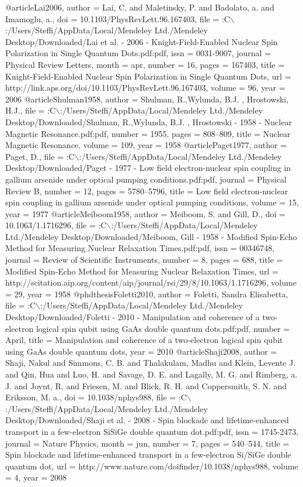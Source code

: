 @article{Lai2006,
author = {Lai, C. and Maletinsky, P. and Badolato, a. and Imamoglu, a.},
doi = {10.1103/PhysRevLett.96.167403},
file = {:C$\backslash$:/Users/Steffi/AppData/Local/Mendeley Ltd./Mendeley Desktop/Downloaded/Lai et al. - 2006 - Knight-Field-Enabled Nuclear Spin Polarization in Single Quantum Dots.pdf:pdf},
issn = {0031-9007},
journal = {Physical Review Letters},
month = {apr},
number = {16},
pages = {167403},
title = {{Knight-Field-Enabled Nuclear Spin Polarization in Single Quantum Dots}},
url = {http://link.aps.org/doi/10.1103/PhysRevLett.96.167403},
volume = {96},
year = {2006}
}
@article{Shulman1958,
author = {{Shulman, R.,Wylunda, B.J. , Hrostowski}, H.J.},
file = {:C$\backslash$:/Users/Steffi/AppData/Local/Mendeley Ltd./Mendeley Desktop/Downloaded/Shulman, R.,Wylunda, B.J. , Hrostowski - 1958 - Nuclear Magnetic Resonance.pdf:pdf},
number = {1955},
pages = {808--809},
title = {{Nuclear Magnetic Resonance}},
volume = {109},
year = {1958}
}
@article{Paget1977,
author = {Paget, D.},
file = {:C$\backslash$:/Users/Steffi/AppData/Local/Mendeley Ltd./Mendeley Desktop/Downloaded/Paget - 1977 - Low field electron-nuclear spin coupling in gallium arsenide under optical pumping conditions.pdf:pdf},
journal = {Physical Review B},
number = {12},
pages = {5780--5796},
title = {{Low field electron-nuclear spin coupling in gallium arsenide under optical pumping conditions}},
volume = {15},
year = {1977}
}
@article{Meiboom1958,
author = {Meiboom, S. and Gill, D.},
doi = {10.1063/1.1716296},
file = {:C$\backslash$:/Users/Steffi/AppData/Local/Mendeley Ltd./Mendeley Desktop/Downloaded/Meiboom, Gill - 1958 - Modified Spin-Echo Method for Measuring Nuclear Relaxation Times.pdf:pdf},
issn = {00346748},
journal = {Review of Scientific Instruments},
number = {8},
pages = {688},
title = {{Modified Spin-Echo Method for Measuring Nuclear Relaxation Times}},
url = {http://scitation.aip.org/content/aip/journal/rsi/29/8/10.1063/1.1716296},
volume = {29},
year = {1958}
}
@phdthesis{Foletti2010,
author = {Foletti, Sandra Elisabetta},
file = {:C$\backslash$:/Users/Steffi/AppData/Local/Mendeley Ltd./Mendeley Desktop/Downloaded/Foletti - 2010 - Manipulation and coherence of a two-electron logical spin qubit using GaAs double quantum dots.pdf:pdf},
number = {April},
title = {{Manipulation and coherence of a two-electron logical spin qubit using GaAs double quantum dots}},
year = {2010}
}
@article{Shaji2008,
author = {Shaji, Nakul and Simmons, C. B. and Thalakulam, Madhu and Klein, Levente J. and Qin, Hua and Luo, H. and Savage, D. E. and Lagally, M. G. and Rimberg, a. J. and Joynt, R. and Friesen, M. and Blick, R. H. and Coppersmith, S. N. and Eriksson, M. a.},
doi = {10.1038/nphys988},
file = {:C$\backslash$:/Users/Steffi/AppData/Local/Mendeley Ltd./Mendeley Desktop/Downloaded/Shaji et al. - 2008 - Spin blockade and lifetime-enhanced transport in a few-electron SiSiGe double quantum dot.pdf:pdf},
issn = {1745-2473},
journal = {Nature Physics},
month = {jun},
number = {7},
pages = {540--544},
title = {{Spin blockade and lifetime-enhanced transport in a few-electron Si/SiGe double quantum dot}},
url = {http://www.nature.com/doifinder/10.1038/nphys988},
volume = {4},
year = {2008}
}
